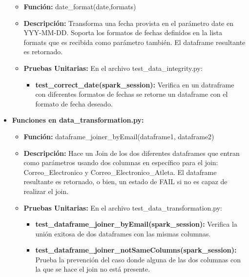 \documentclass[a4paper]{article}
\begin{document}
\begin{itemize}
        \begin{itemize}
            \item \textbf{Funci\'{o}n:} date\_format(date,formats)
            \item \textbf{Descripci\'{o}n:} Transforma una fecha provista en el par\'{a}metro date en YYY-MM-DD. Soporta los formatos de fechas definidos en la lista formats que es recibida como par\'{a}metro tambi\'{e}n. El dataframe resultante es retornado.
            \item \textbf{Pruebas Unitarias:} En el archivo test\_data\_integrity.py:
                \begin{itemize}
                    \item \textbf{test\_correct\_date(spark\_session):} Verifica en un datraframe con diferentes formatos de fechas se retorne un dataframe con el formato de fecha deseado.
                \end{itemize}
        \end{itemize}

    \item \textbf{Funciones en data\_transformation.py:}
        \begin{itemize}
            \item \textbf{Funci\'{o}n:} dataframe\_joiner\_byEmail(dataframe1, dataframe2)
            \item \textbf{Descripci\'{o}n:} Hace un Join de los dos diferentes dataframes que entran como par\'{a}metros usando dos columnas en espec\'{i}fico para el join: Correo\_Electronico y Correo\_Electronico\_Atleta. El dataframe resultante es retornado, o bien, un estado de FAIL si no es capaz de realizar el join.
            \item \textbf{Pruebas Unitarias:} En el archivo test\_data\_transformation.py:
                \begin{itemize}
                    \item \textbf{test\_dataframe\_joiner\_byEmail(spark\_session):} Verifica la uni\'{o}n exitosa de dos dataframes con las mismas columnas.
                    \item \textbf{test\_dataframe\_joiner\_notSameColumns(spark\_session):} Prueba la prevenci\'{o}n del caso donde alguna de las dos columnas con la que se hace el join no est\'{a} presente.
                \end{itemize}
        \end{itemize}


\end{itemize}
\end{document}
